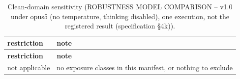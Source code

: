 \begingroup\footnotesize
\begin{longtable}{>{\raggedright\arraybackslash}p{126.4pt}>{\raggedright\arraybackslash}p{304.6pt}}
\caption{Clean-domain sensitivity (ROBUSTNESS MODEL COMPARISON -- v1.0 under opus5 (no temperature, thinking disabled), one execution, not the registered result (specification §4k)).} \\
\toprule
\textbf{restriction} & \textbf{note} \\
\midrule
\endfirsthead
\toprule
\textbf{restriction} & \textbf{note} \\
\midrule
\endhead
\bottomrule
\endfoot
not applicable & no exposure classes in this manifest, or nothing to exclude \\
\end{longtable}
\endgroup
